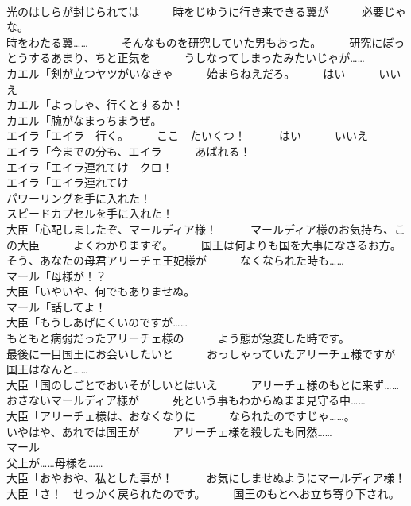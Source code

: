 \documentclass[8pt]{extreport}
\begin{document}
\begin{CJK}{UTF8}{min}
\\	光のはしらが封じられては　　　時をじゆうに行き来できる翼が　　　必要じゃな。	
\\	時をわたる翼……　　　そんなものを研究していた男もおった。　　　研究にぼっとうするあまり、ちと正気を　　　うしなってしまったみたいじゃが……	
\\	カエル「剣が立つヤツがいなきゃ　　　始まらねえだろ。　　　はい　　　いいえ	
\\	カエル「よっしゃ、行くとするか！	
\\	カエル「腕がなまっちまうぜ。	
\\	エイラ「エイラ　行く。　　　ここ　たいくつ！　　　はい　　　いいえ	
\\	エイラ「今までの分も、エイラ　　　あばれる！	
\\	エイラ「エイラ連れてけ　クロ！	
\\	エイラ「エイラ連れてけ　　　
\\	パワーリングを手に入れた！	
\\	スピードカプセルを手に入れた！	
\\	大臣「心配しましたぞ、マールディア様！　　　マールディア様のお気持ち、この大臣　　　よくわかりますぞ。　　　国王は何よりも国を大事になさるお方。　　　そう、あなたの母君アリーチェ王妃様が　　　なくなられた時も……	
\\	マール「母様が！？	
\\	大臣「いやいや、何でもありませぬ。	
\\	マール「話してよ！	
\\	大臣「もうしあげにくいのですが……	
\\	もともと病弱だったアリーチェ様の　　　よう態が急変した時です。	
\\	最後に一目国王にお会いしたいと　　　おっしゃっていたアリーチェ様ですが　　　国王はなんと……	
\\	大臣「国のしごとでおいそがしいとはいえ　　　アリーチェ様のもとに来ず……	
\\	おさないマールディア様が　　　死という事もわからぬまま見守る中……	
\\	大臣「アリーチェ様は、おなくなりに　　　なられたのですじゃ……。	
\\	いやはや、あれでは国王が　　　アリーチェ様を殺したも同然……	
\\	マール
\\	父上が……母様を……	
\\	大臣「おやおや、私とした事が！　　　お気にしませぬようにマールディア様！	
\\	大臣「さ！　せっかく戻られたのです。　　　国王のもとへお立ち寄り下され。	

\end{CJK}
\end{document}
